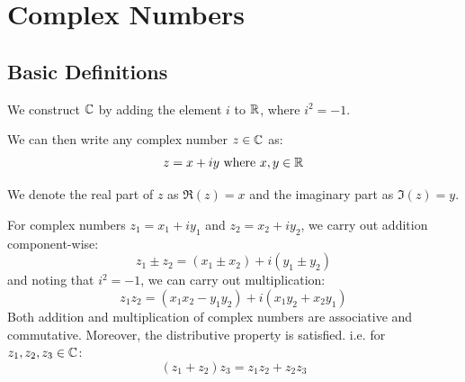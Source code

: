 \documentclass[../main.tex]{subfiles}
\begin{document}
\chapter{Complex Numbers}
\section{Basic Definitions}
\begin{definition}
  We construct $\mathbb{C}$ by adding the element $i$ to $\mathbb{R}$, where $i^2 = -1$.

  We can then write any complex number $z \in \mathbb{C}$ as:
  \[
    z = x + iy \text{ where } x, y \in \mathbb{R}
  \]
\end{definition}
We denote the real part of $z$ as $\Re(z) = x$ and the imaginary part as $\Im(z) = y$.

For complex numbers $z_1 = x_1 + i y_1$ and $z_2 = x_2 + i y_2$, we carry out addition component-wise:
\[
  z_1 \pm z_2 = (x_1 \pm x_2) + i(y_ 1 \pm y_2)
\]
and noting that $i^2 = -1$, we can carry out multiplication:
\begin{equation}
  z_1 z_2 = (x_1 x_2 - y_1 y_2) + i(x_1 y_2 + x_2 y_1)
  \label{complexMult}
\end{equation}
Both addition and multiplication of complex numbers are associative and commutative.
Moreover, the distributive property is satisfied. i.e. for $z_1, z_2, z_3 \in \mathbb{C}$:
\[
  (z_1 + z_2)z_3 = z_1 z_2 + z_2 z_3
\]
\end{document}
